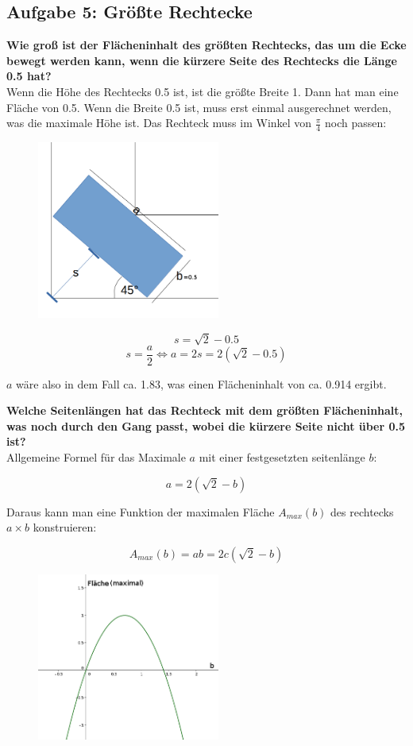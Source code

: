 \documentclass[a4paper,11pt]{article}
\begin{document}
\subsection{Aufgabe 5: Gr\"o\ss te Rechtecke}

\textbf{Wie groß ist der Flächeninhalt des größten Rechtecks, das um die Ecke bewegt werden kann,
wenn die kürzere Seite des Rechtecks die Länge 0.5 hat?} \\
Wenn die H\"ohe des Rechtecks 0.5 ist, ist die gr\"o\ss te Breite 1. Dann hat man eine Fl\"ache von 0.5.
Wenn die Breite 0.5 ist, muss erst einmal ausgerechnet werden, was die maximale H\"ohe ist. Das Rechteck muss im Winkel von $\frac{\pi}{4}$ noch passen: 

\begin{figure}[H] 
        \centering
        \includegraphics[width=6cm]{img/A5_1.png}
\end{figure}

\[ s = \sqrt{2} - 0.5 \]
\[ s = \frac{a}{2} \Leftrightarrow a = 2s = 2(\sqrt{2}-0.5) \]

$a$ w\"are also in dem Fall ca. 1.83, was einen Fl\"acheninhalt von ca. 0.914 ergibt.

\textbf{Welche Seitenl\"angen hat das Rechteck mit dem gr\"o\ss ten Fl\"acheninhalt, was noch durch den Gang passt, wobei die k\"urzere Seite nicht \"uber 0.5 ist?} \\
Allgemeine Formel f\"ur das Maximale $a$ mit einer festgesetzten seitenl\"ange $b$:

\[ a = 2(\sqrt{2}-b) \]

Daraus kann man eine Funktion der maximalen Fl\"ache $A_{max}(b)$ des rechtecks $a \times b$ konstruieren:

\[ A_{max}(b) = a b = 2c(\sqrt{2}-b) \]

\begin{figure}[H] 
        \centering
        \includegraphics[width=6cm]{img/A5_2.png}
\end{figure}
\end{document}
